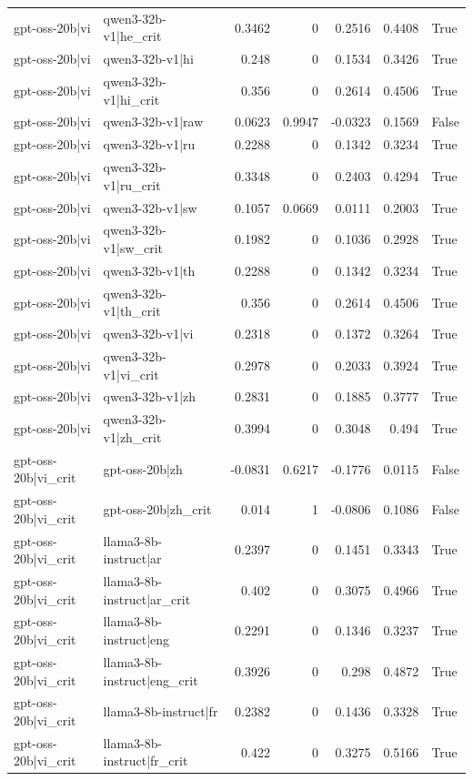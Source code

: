 \begin{table}
\begin{tabular}{l l r r r r l}
gpt-oss-20b|vi & qwen3-32b-v1|he_crit & 0.3462 & 0 & 0.2516 & 0.4408 & True \\
gpt-oss-20b|vi & qwen3-32b-v1|hi & 0.248 & 0 & 0.1534 & 0.3426 & True \\
gpt-oss-20b|vi & qwen3-32b-v1|hi_crit & 0.356 & 0 & 0.2614 & 0.4506 & True \\
gpt-oss-20b|vi & qwen3-32b-v1|raw & 0.0623 & 0.9947 & -0.0323 & 0.1569 & False \\
gpt-oss-20b|vi & qwen3-32b-v1|ru & 0.2288 & 0 & 0.1342 & 0.3234 & True \\
gpt-oss-20b|vi & qwen3-32b-v1|ru_crit & 0.3348 & 0 & 0.2403 & 0.4294 & True \\
gpt-oss-20b|vi & qwen3-32b-v1|sw & 0.1057 & 0.0669 & 0.0111 & 0.2003 & True \\
gpt-oss-20b|vi & qwen3-32b-v1|sw_crit & 0.1982 & 0 & 0.1036 & 0.2928 & True \\
gpt-oss-20b|vi & qwen3-32b-v1|th & 0.2288 & 0 & 0.1342 & 0.3234 & True \\
gpt-oss-20b|vi & qwen3-32b-v1|th_crit & 0.356 & 0 & 0.2614 & 0.4506 & True \\
gpt-oss-20b|vi & qwen3-32b-v1|vi & 0.2318 & 0 & 0.1372 & 0.3264 & True \\
gpt-oss-20b|vi & qwen3-32b-v1|vi_crit & 0.2978 & 0 & 0.2033 & 0.3924 & True \\
gpt-oss-20b|vi & qwen3-32b-v1|zh & 0.2831 & 0 & 0.1885 & 0.3777 & True \\
gpt-oss-20b|vi & qwen3-32b-v1|zh_crit & 0.3994 & 0 & 0.3048 & 0.494 & True \\
gpt-oss-20b|vi_crit & gpt-oss-20b|zh & -0.0831 & 0.6217 & -0.1776 & 0.0115 & False \\
gpt-oss-20b|vi_crit & gpt-oss-20b|zh_crit & 0.014 & 1 & -0.0806 & 0.1086 & False \\
gpt-oss-20b|vi_crit & llama3-8b-instruct|ar & 0.2397 & 0 & 0.1451 & 0.3343 & True \\
gpt-oss-20b|vi_crit & llama3-8b-instruct|ar_crit & 0.402 & 0 & 0.3075 & 0.4966 & True \\
gpt-oss-20b|vi_crit & llama3-8b-instruct|eng & 0.2291 & 0 & 0.1346 & 0.3237 & True \\
gpt-oss-20b|vi_crit & llama3-8b-instruct|eng_crit & 0.3926 & 0 & 0.298 & 0.4872 & True \\
gpt-oss-20b|vi_crit & llama3-8b-instruct|fr & 0.2382 & 0 & 0.1436 & 0.3328 & True \\
gpt-oss-20b|vi_crit & llama3-8b-instruct|fr_crit & 0.422 & 0 & 0.3275 & 0.5166 & True \\

\end{tabular}
\end{table}
